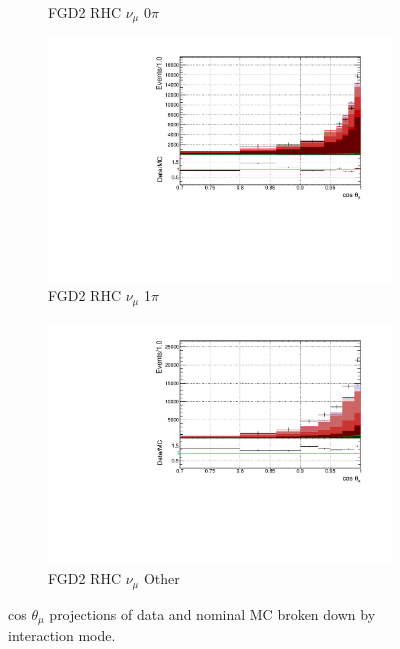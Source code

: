 \begin{figure}
\begin{subfigure}{.32\textwidth}
  \caption{FGD2 RHC $\nu_{\mu}$ 0$\pi$}
  \label{fig:tstack_FGD2_NuMuBkg_CC0pi_in_AntiNu_Mode}
\end{subfigure}
\begin{subfigure}{.32\textwidth}
  \centering
  \includegraphics[width=0.95\linewidth]{figs/FGD2_NuMuBkg_CC1pi_in_AntiNu_Mode_t}
  \caption{FGD2 RHC $\nu_{\mu}$ 1$\pi$}
  \label{fig:tstack_FGD2_NuMuBkg_CC1pi_in_AntiNu_Mode}
\end{subfigure}
\begin{subfigure}{.32\textwidth}
  \centering
  \includegraphics[width=0.95\linewidth]{figs/FGD2_NuMuBkg_CCOther_in_AntiNu_Mode_t}
  \caption{FGD2 RHC $\nu_{\mu}$ Other}
  \label{fig:tstack_FGD2_NuMuBkg_CCOther_in_AntiNu_Mode}
\end{subfigure}
\caption{cos $\theta_{\mu}$ projections of data and nominal MC broken down by interaction mode.}
\label{fig:tstack}
\end{figure}

